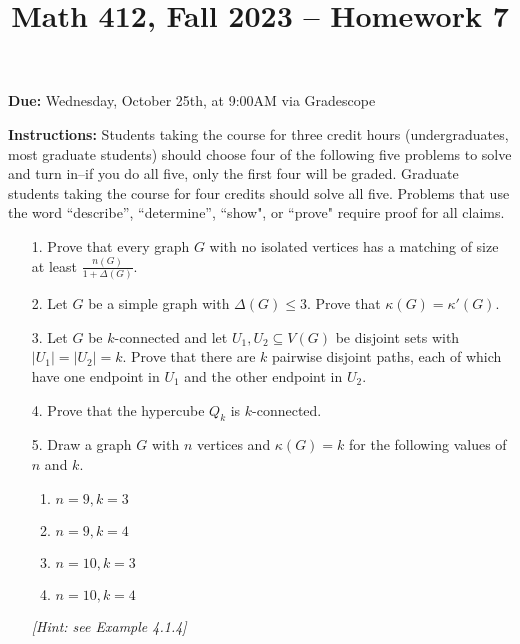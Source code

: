 \documentclass[12pt]{article}
\title{Math 412, Fall 2023 -- Homework 7}
\date{}
\begin{document}
 \maketitle
\vspace{-80pt}

\textbf{Due:} Wednesday, October 25th, at 9:00AM via Gradescope

\textbf{Instructions:} Students taking the course for three credit hours (undergraduates, most graduate
students) should choose four of the following five problems to solve and turn in--if you do all five, only the first four will be graded. Graduate students
taking the course for four credits should solve all five. Problems that use the word ``describe”,
``determine”, ``show", or ``prove" require proof for all claims.

\begin{enumerate}

\item[1.] Prove that every graph $G$ with no isolated vertices has a matching of size at least $\frac{n(G)}{1+\Delta(G)}$.

\item[2.] Let $G$ be a simple graph with $\Delta(G)\leq 3$. Prove that $\kappa(G)=\kappa'(G)$.

\item[3.] Let $G$ be $k$-connected and let $U_1,U_2\subseteq V(G)$ be disjoint sets with $|U_1|=|U_2|=k$. Prove that there are $k$ pairwise disjoint paths, each of which have one endpoint in $U_1$ and the other endpoint in $U_2$.

\item[4.] Prove that the hypercube $Q_k$ is $k$-connected.

\item[5.] Draw a graph $G$ with $n$ vertices and $\kappa(G)=k$ for the following values of $n$ and $k$.

\begin{enumerate}
    \item $n=9, k=3$
    \item $n=9, k=4$
    \item $n=10, k=3$
    \item $n=10, k=4$
\end{enumerate}

\emph{[Hint: see Example 4.1.4]}

\end{enumerate}
\end{document}
